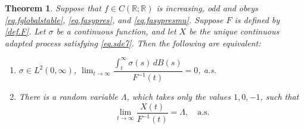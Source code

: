\documentclass[a4paper,10pt,reqno]{amsart}
\numberwithin{equation}{section}
\newtheorem{theorem}{Theorem}
\theoremstyle{definition}
\theoremstyle{remark}
\DeclareMathOperator{\1}{\mathbbm 1}
\begin{document}
	\begin{theorem} \label{thm.Xwithtailmart}
		Suppose that $f\in C(\mathbb{R};\mathbb{R})$ is increasing, odd and obeys \eqref{eq.fglobalstable}, \eqref{eq.fasypres}, and \eqref{eq.fasypresmu}. Suppose $F$ is defined by \eqref{def.F}.  Let $\sigma$ be a continuous function, and let $X$ be the unique continuous adapted process satisfying \eqref{eq.sde7}.
		Then the following are equivalent:
		\begin{enumerate}
			\item[(A)] $\sigma \in L^2(0,\infty)$, \quad $\lim_{t \to \infty} \dfrac{\int_{t}^{\infty} \sigma(s)\, dB(s)}{F^{-1}(t)} = 0$, \; a.s.
			\item[(B)] There is a random variable $\Lambda$, which takes only the values $1,0,-1$, such that
			\[
			\lim_{t \to \infty} \frac{X(t)}{F^{-1}(t)} = \Lambda, \quad \text{a.s.}
			\]
		\end{enumerate}
	\end{theorem}
\end{document}
